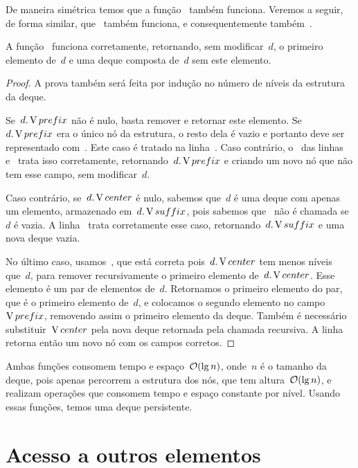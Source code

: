 \documentclass[main.tex]{subfiles}
\begin{document}
De maneira simétrica temos que a função~ também funciona. Veremos a seguir, de forma similar, que~ também funciona, e consequentemente também~.

\begin{proposition}
A função~ funciona corretamente, retornando, sem modificar~$d$, o primeiro elemento de~$d$ e uma deque composta de~$d$ sem este elemento.
\end{proposition}

\begin{proof}
A prova também será feita por indução no número de níveis da estrutura da deque.

    Se~$d.\operatorname{V}{prefix}$ não é nulo, basta remover e retornar este elemento. Se~$d.\operatorname{V}{prefix}$ era o único nó da estrutura, o resto dela é vazio e portanto deve ser representado com~. Este caso é tratado na linha~. Caso contrário, o~ das linhas~ e~ trata isso corretamente, retornando~$d.\operatorname{V}{prefix}$ e criando um novo nó que não tem esse campo, sem modificar~$d$.

Caso contrário, se~$d.\operatorname{V}{center}$ é nulo, sabemos que~$d$ é uma deque com apenas um elemento, armazenado em~$d.\operatorname{V}{suffix}$, pois sabemos que~ não é chamada se~$d$ é vazia. A linha~ trata corretamente esse caso, retornando~$d.\operatorname{V}{suffix}$ e uma nova deque vazia.

No último caso, usamos~, que está correta pois~$d.\operatorname{V}{center}$ tem menos níveis que~$d$, para remover recursivamente o primeiro elemento de~$d.\operatorname{V}{center}$. Esse elemento é um par de elementos de~$d$. Retornamos o primeiro elemento do par, que é o primeiro elemento de~$d$, e colocamos o segundo elemento no campo~$\operatorname{V}{prefix}$, removendo assim o primeiro elemento da deque. Também é necessário substituir~$\operatorname{V}{center}$ pela nova deque retornada pela chamada recursiva. A linha~ retorna então um novo nó com os campos corretos.
\end{proof}

Ambas funções consomem tempo e espaço~$\mathcal{O}(\lg n)$, onde~$n$ é o tamanho da deque, pois apenas percorrem a estrutura dos nós, que tem altura~$\mathcal{O}(\lg n)$, e realizam operações que consomem tempo e espaço constante por nível. Usando essas funções, temos uma deque persistente.

\section{Acesso a outros elementos}
\end{document}
